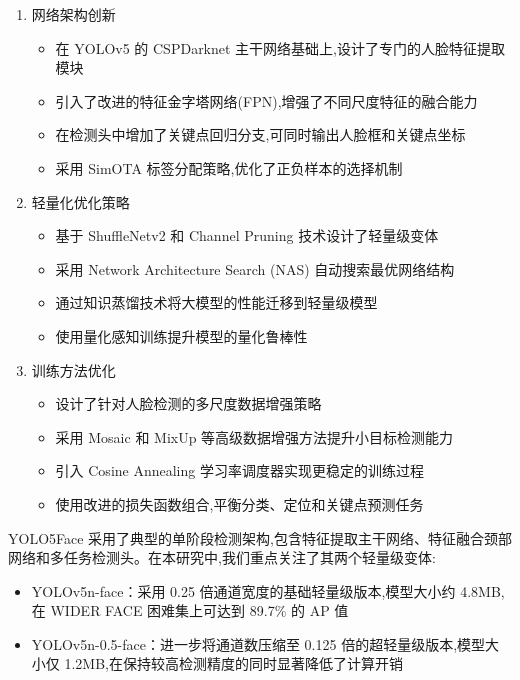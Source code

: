 \documentclass{article}
\begin{document}
\begin{enumerate}
    \item 网络架构创新
    \begin{itemize}
        \item 在 YOLOv5 的 CSPDarknet 主干网络基础上,设计了专门的人脸特征提取模块
        \item 引入了改进的特征金字塔网络(FPN),增强了不同尺度特征的融合能力
        \item 在检测头中增加了关键点回归分支,可同时输出人脸框和关键点坐标
        \item 采用 SimOTA 标签分配策略,优化了正负样本的选择机制
    \end{itemize}
    
    \item 轻量化优化策略
    \begin{itemize}
        \item 基于 ShuffleNetv2 和 Channel Pruning 技术设计了轻量级变体
        \item 采用 Network Architecture Search (NAS) 自动搜索最优网络结构
        \item 通过知识蒸馏技术将大模型的性能迁移到轻量级模型
        \item 使用量化感知训练提升模型的量化鲁棒性
    \end{itemize}
    
    \item 训练方法优化
    \begin{itemize}
        \item 设计了针对人脸检测的多尺度数据增强策略
        \item 采用 Mosaic 和 MixUp 等高级数据增强方法提升小目标检测能力
        \item 引入 Cosine Annealing 学习率调度器实现更稳定的训练过程
        \item 使用改进的损失函数组合,平衡分类、定位和关键点预测任务
    \end{itemize}
\end{enumerate}

YOLO5Face 采用了典型的单阶段检测架构,包含特征提取主干网络、特征融合颈部网络和多任务检测头。在本研究中,我们重点关注了其两个轻量级变体:

\begin{itemize}
    \item YOLOv5n-face：采用 0.25 倍通道宽度的基础轻量级版本,模型大小约 4.8MB,在 WIDER FACE 困难集上可达到 89.7\% 的 AP 值
    \item YOLOv5n-0.5-face：进一步将通道数压缩至 0.125 倍的超轻量级版本,模型大小仅 1.2MB,在保持较高检测精度的同时显著降低了计算开销
\end{itemize}
\end{document}
